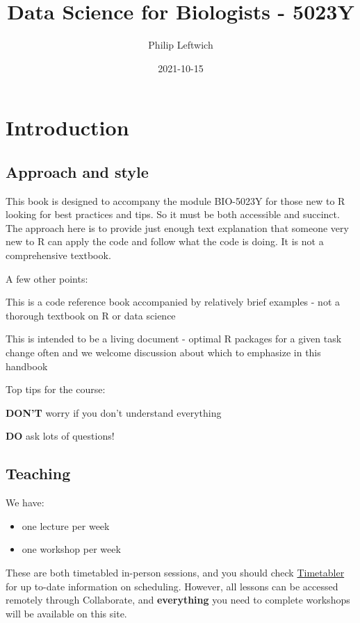 \documentclass[
]{book}
\title{Data Science for Biologists - 5023Y}
\author{Philip Leftwich}
\date{2021-10-15}
\providecommand{\tightlist}{%
  \setlength{\itemsep}{0pt}\setlength{\parskip}{0pt}}
\begin{document}
\maketitle

{
\setcounter{tocdepth}{1}
\tableofcontents
}
\hypertarget{introduction}{%
\chapter{Introduction}\label{introduction}}

\hypertarget{approach-and-style}{%
\section{Approach and style}\label{approach-and-style}}

This book is designed to accompany the module BIO-5023Y for those new to R looking for best practices and tips. So it must be both accessible and succinct. The approach here is to provide just enough text explanation that someone very new to R can apply the code and follow what the code is doing. It is not a comprehensive textbook.

A few other points:

This is a code reference book accompanied by relatively brief examples - not a thorough textbook on R or data science

This is intended to be a living document - optimal R packages for a given task change often and we welcome discussion about which to emphasize in this handbook

Top tips for the course:

\textbf{DON'T} worry if you don't understand everything

\textbf{DO} ask lots of questions!

\hypertarget{teaching}{%
\section{Teaching}\label{teaching}}

We have:

\begin{itemize}
\tightlist
\item
  one lecture per week
\item
  one workshop per week
\end{itemize}

These are both timetabled in-person sessions, and you should check \href{https://timetabler.uea.ac.uk/Timetable}{Timetabler} for up to-date information on scheduling. However, all lessons can be accessed remotely through Collaborate, and \textbf{everything} you need to complete workshops will be available on this site.
\end{document}
